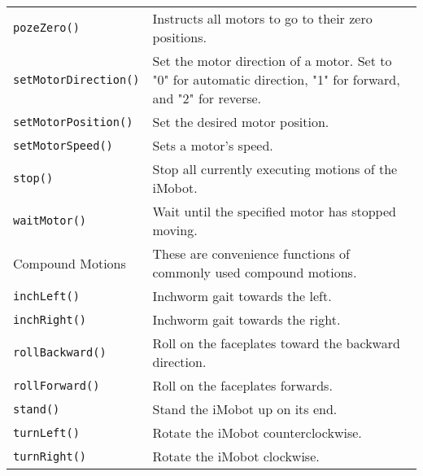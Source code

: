 \begin{table}[!hp]
\begin{center}
\begin{tabular}{p{38 mm}p{77 mm}}
\texttt{pozeZero()} \dotfill & Instructs all motors to go to their zero positions. \\
\texttt{setMotorDirection()} \dotfill & Set the motor direction of a motor. Set
to "0" for automatic direction, "1" for forward, and "2" for reverse. \\
\texttt{setMotorPosition()} \dotfill & Set the desired motor position. \\
\texttt{setMotorSpeed()} \dotfill & Sets a motor's speed. \\
\texttt{stop()} \dotfill & Stop all currently executing motions of the iMobot. \\
\texttt{waitMotor()} \dotfill & Wait until the specified motor has stopped moving. \\
\hline
Compound Motions & These are convenience functions of commonly used compound motions. \\
\hline
\texttt{inchLeft()} \dotfill & Inchworm gait towards the left. \\
\texttt{inchRight()} \dotfill & Inchworm gait towards the right. \\
\texttt{rollBackward()} \dotfill & Roll on the faceplates toward the backward direction. \\
\texttt{rollForward()} \dotfill & Roll on the faceplates forwards. \\
\texttt{stand()} \dotfill & Stand the iMobot up on its end. \\
\texttt{turnLeft()} \dotfill & Rotate the iMobot counterclockwise. \\
\texttt{turnRight()} \dotfill & Rotate the iMobot clockwise. \\
\hline
\end{tabular}
\end{center}
\label{mobilec_api_cbinary}
\end{table}

\newpage

\pagebreak

\pagebreak

\pagebreak

\pagebreak

\pagebreak

\pagebreak

\pagebreak

\pagebreak

\pagebreak

\pagebreak

\pagebreak

\pagebreak

\pagebreak

\pagebreak

\pagebreak

\pagebreak

\pagebreak

\pagebreak

\pagebreak

\pagebreak

\pagebreak

